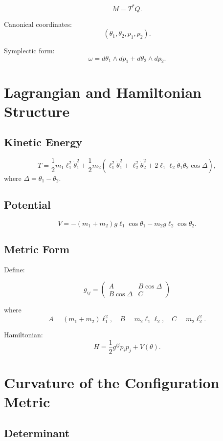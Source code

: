 \documentclass[11pt,oneside]{book}
\begin{document}
\[
M=T^*Q.
\]

Canonical coordinates:
\[
(\theta_1,\theta_2,p_1,p_2).
\]

Symplectic form:
\[
\omega=d\theta_1\wedge dp_1+d\theta_2\wedge dp_2.
\]

\chapter{Lagrangian and Hamiltonian Structure}

\section{Kinetic Energy}

\[
T=\frac12 m_1 \ell_1^2 \dot\theta_1^2
+\frac12 m_2(\ell_1^2\dot\theta_1^2
+\ell_2^2\dot\theta_2^2
+2\ell_1\ell_2\dot\theta_1\dot\theta_2\cos\Delta),
\]
where $\Delta=\theta_1-\theta_2$.

\section{Potential}

\[
V=-(m_1+m_2)g\ell_1\cos\theta_1
-m_2 g\ell_2\cos\theta_2.
\]

\section{Metric Form}

Define:

\[
g_{ij}=
\begin{pmatrix}
A & B\cos\Delta\\
B\cos\Delta & C
\end{pmatrix}
\]

where
\[
A=(m_1+m_2)\ell_1^2,
\quad
B=m_2\ell_1\ell_2,
\quad
C=m_2\ell_2^2.
\]

Hamiltonian:
\[
H=\frac12 g^{ij}p_i p_j + V(\theta).
\]

\chapter{Curvature of the Configuration Metric}

\section{Determinant}
\end{document}
